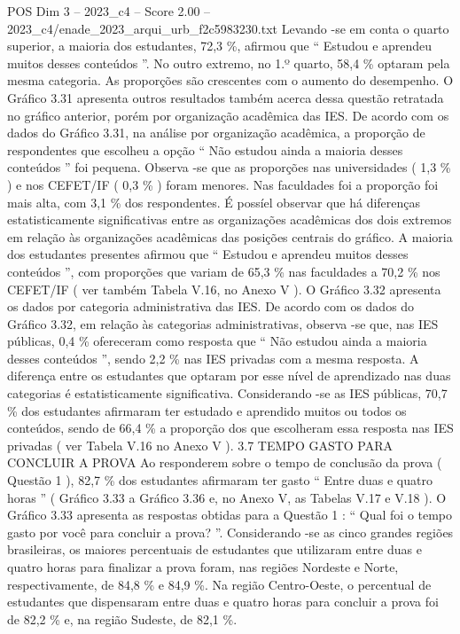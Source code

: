 \begin{textsample}{POS Dim 3 – 2023\_c4 – Score 2.00 – 2023\_c4/enade\_2023\_arqui\_urb\_f2c5983230.txt}
Levando -se em conta o quarto superior, a maioria dos estudantes, 72,3 \%, afirmou que “ Estudou e aprendeu muitos desses conteúdos ”.
No outro extremo, no 1.º quarto, 58,4 \% optaram pela mesma categoria.
As proporções são crescentes com o aumento do desempenho.
O Gráfico 3.31 apresenta outros resultados também acerca dessa questão retratada no gráfico anterior, porém por organização acadêmica das IES.
De acordo com os dados do Gráfico 3.31, na análise por organização acadêmica, a proporção de respondentes que escolheu a opção “ Não estudou ainda a maioria desses conteúdos ” foi pequena.
Observa -se que as proporções nas universidades ( 1,3 \% ) e nos CEFET/IF ( 0,3 \% ) foram menores.
Nas faculdades foi a proporção foi mais alta, com 3,1 \% dos respondentes.
É possíel observar que há diferenças estatisticamente significativas entre as organizações acadêmicas dos dois extremos em relação às organizações acadêmicas das posições centrais do gráfico.
A maioria dos estudantes presentes afirmou que “ Estudou e aprendeu muitos desses conteúdos ”, com proporções que variam de 65,3 \% nas faculdades a 70,2 \% nos CEFET/IF ( ver também Tabela V.16, no Anexo V ).
O Gráfico 3.32 apresenta os dados por categoria administrativa das IES.
De acordo com os dados do Gráfico 3.32, em relação às categorias administrativas, observa -se que, nas IES públicas, 0,4 \% ofereceram como resposta que “ Não estudou ainda a maioria desses conteúdos ”, sendo 2,2 \% nas IES privadas com a mesma resposta.
A diferença entre os estudantes que optaram por esse nível de aprendizado nas duas categorias é estatisticamente significativa.
Considerando -se as IES públicas, 70,7 \% dos estudantes afirmaram ter estudado e aprendido muitos ou todos os conteúdos, sendo de 66,4 \% a proporção dos que escolheram essa resposta nas IES privadas ( ver Tabela V.16 no Anexo V ). 3.7 TEMPO GASTO PARA CONCLUIR A PROVA Ao responderem sobre o tempo de conclusão da prova ( Questão 1 ), 82,7 \% dos estudantes afirmaram ter gasto “ Entre duas e quatro horas ” ( Gráfico 3.33 a Gráfico 3.36 e, no Anexo V, as Tabelas V.17 e V.18 ).
O Gráfico 3.33 apresenta as respostas obtidas para a Questão 1 : “ Qual foi o tempo gasto por você para concluir a prova? ”.
Considerando -se as cinco grandes regiões brasileiras, os maiores percentuais de estudantes que utilizaram entre duas e quatro horas para finalizar a prova foram, nas regiões Nordeste e Norte, respectivamente, de 84,8 \% e 84,9 \%.
Na região Centro-Oeste, o percentual de estudantes que dispensaram entre duas e quatro horas para concluir a prova foi de 82,2 \% e, na região Sudeste, de 82,1 \%.

\end{textsample}
